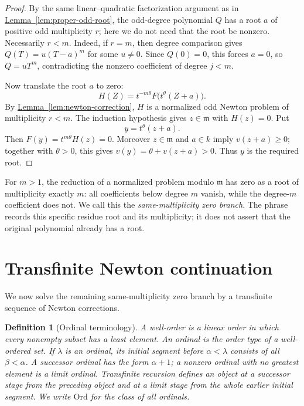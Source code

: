 \documentclass[11pt]{article}
\newcommand{\Val}{v}
\newcommand{\namedref}[2]{\hyperref[#2]{#1~\ref*{#2}}}
\theoremstyle{proofnote}
\newtheorem{definition}[theorem]{Definition}
\begin{document}
\begin{proof}
  By the same linear--quadratic factorization argument as in
  \namedref{Lemma}{lem:proper-odd-root}, the odd-degree polynomial \(Q\)
  has a root \(a\) of positive odd multiplicity \(r\); here we do not need
  that the root be nonzero.  Necessarily \(r<m\).  Indeed, if \(r=m\), then
  degree comparison gives \(Q(T)=u(T-a)^m\) for some \(u\ne0\).  Since
  \(Q(0)=0\), this forces \(a=0\), so \(Q=uT^m\), contradicting the
  nonzero coefficient of degree \(j<m\).

  Now translate the root \(a\) to zero:
  \[
    H(Z)=t^{-m\theta}F\bigl(t^\theta(Z+a)\bigr).
  \]
  By \namedref{Lemma}{lem:newton-correction}, \(H\) is a normalized odd
  Newton problem of multiplicity \(r<m\).  The induction hypothesis gives
  \(z\in\mathfrak m\) with \(H(z)=0\).  Put
  \[
    y=t^\theta(z+a).
  \]
  Then \(F(y)=t^{m\theta}H(z)=0\).  Moreover \(z\in\mathfrak m\) and
  \(a\in k\) imply \(\Val(z+a)\ge0\); together with \(\theta>0\), this gives
  \(\Val(y)=\theta+\Val(z+a)>0\).  Thus \(y\) is the required root.
\end{proof}

For \(m>1\), the reduction of a normalized problem modulo \(\mathfrak m\)
has zero as a root of multiplicity exactly \(m\): all coefficients below
degree \(m\) vanish, while the degree-\(m\) coefficient does not.  We call
this the \emph{same-multiplicity zero branch}.  The phrase records this
specific residue root and its multiplicity; it does not assert that the
original polynomial already has a root.

\section{Transfinite Newton continuation}
\label{sec:transfinite}

We now solve the remaining same-multiplicity zero branch by a transfinite
sequence of Newton corrections.

\begin{definition}[Ordinal terminology]
\label{def:ordinal-terminology}
  A well-order is a linear order in which every nonempty subset has a least
  element.  An ordinal is the order type of a well-ordered set.  If
  \(\lambda\) is an ordinal, its initial segment before \(\alpha<\lambda\)
  consists of all \(\beta<\alpha\).  A successor ordinal has the form
  \(\alpha+1\); a nonzero ordinal with no greatest element is a limit
  ordinal.  Transfinite recursion defines an object at a successor stage from
  the preceding object and at a limit stage from the whole earlier initial
  segment.  We write \(\mathrm{Ord}\) for the class of all ordinals.
\end{definition}
\end{document}
